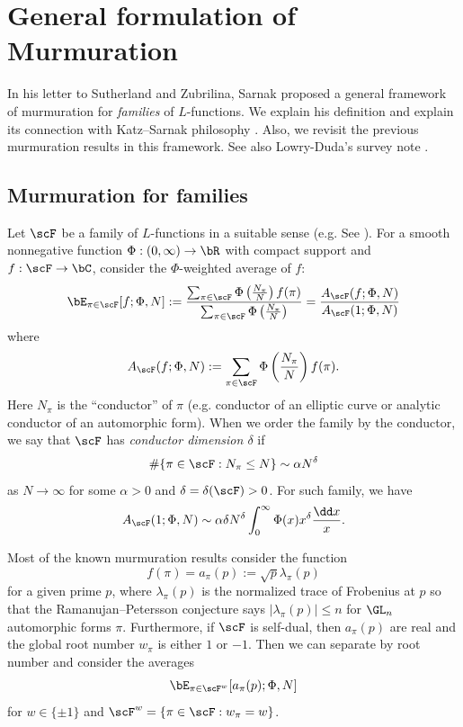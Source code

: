 \section{General formulation of Murmuration}
\label{sec:general}

In his letter to Sutherland and Zubrilina, Sarnak proposed a general framework of murmuration \cite{sarnak} for \emph{families} of $L$-functions.
We explain his definition and explain its connection with Katz--Sarnak philosophy \cite{katz1999zeroes,katz2023random}.
Also, we revisit the previous murmuration results \cite{zubrilina2025murmurations,lee2025murmurations,sawin2025murmurations} in this framework.
See also Lowry-Duda's survey note \cite{lowry2025murmurations}.

\subsection{Murmuration for families}

Let $\scF$ be a family of $L$-functions in a suitable sense (e.g. See \cite{sarnak2016families}).
For a smooth nonnegative function $\Phi : (0, \infty) \to \bR$ with compact support and $f : \scF \to \bC$, consider the $\Phi$-weighted average of $f$:
\begin{equation}
    \bE_{\pi \in \scF}[f; \Phi, N] := \frac{\sum_{\pi \in \scF} \Phi\left(\frac{N_\pi}{N}\right)f(\pi)}{\sum_{\pi \in \scF} \Phi\left(\frac{N_\pi}{N}\right)} = \frac{A_{\scF}(f; \Phi, N)}{A_{\scF}(1; \Phi, N)}
\end{equation}
where
\begin{equation}
    A_{\scF}(f; \Phi, N) := \sum_{\pi \in \scF} \Phi\left(\frac{N_\pi}{N}\right)f(\pi).
\end{equation}
Here $N_\pi$ is the ``conductor'' of $\pi$ (e.g. conductor of an elliptic curve or analytic conductor of an automorphic form).
When we order the family by the conductor, we say that $\scF$ has \emph{conductor dimension $\delta$} if
\begin{equation}
    \# \{\pi \in \scF : N_\pi \le N\} \sim \alpha N^\delta
\end{equation}
as $N \to \infty$ for some $\alpha > 0$ and $\delta = \delta(\scF) > 0$.
For such family, we have
\[
A_\scF(1; \Phi, N) \sim \alpha \delta N^\delta \int_0^\infty \Phi(x) x^\delta \frac{\dd x}{x}.
\]

Most of the known murmuration results consider the function
\begin{equation}
    f(\pi) = a_\pi(p) := \sqrt{p} \lambda_\pi(p)
\end{equation}
for a given prime $p$, where $\lambda_\pi(p)$ is the normalized trace of Frobenius at $p$ so that the Ramanujan--Petersson conjecture says $|\lambda_\pi(p)| \le n$ for $\GL_n$ automorphic forms $\pi$.
Furthermore, if $\scF$ is self-dual, then $a_\pi(p)$ are real and the global root number $w_\pi$ is either $1$ or $-1$.
Then we can separate by root number and consider the averages
\begin{equation}
    \bE_{\pi \in \scF^w} [a_\pi(p); \Phi, N]
\end{equation}
for $w \in \{\pm 1\}$ and $\scF^w = \{\pi \in \scF : w_\pi = w\}$.

